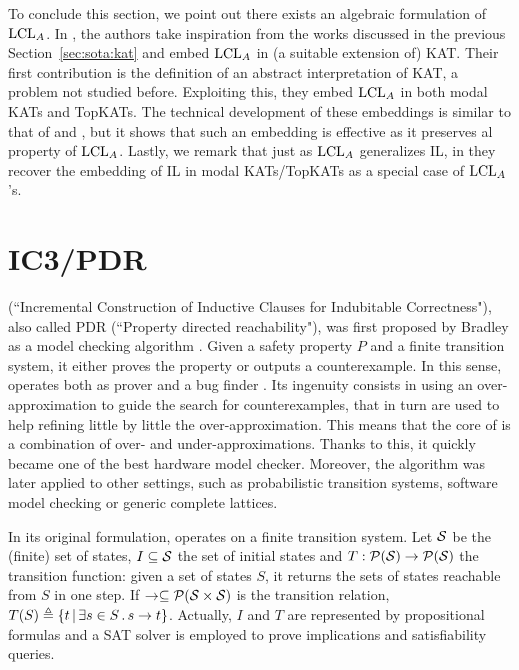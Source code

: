 To conclude this section, we point out there exists an algebraic formulation of $\text{LCL}_A$. In \cite{MR22}, the authors take inspiration from the works discussed in the previous Section~\ref{sec:sota:kat} and embed $\text{LCL}_A$ in (a suitable extension of) KAT. Their first contribution is the definition of an abstract interpretation of KAT, a problem not studied before. Exploiting this, they embed $\text{LCL}_A$ in both modal KATs and TopKATs. The technical development of these embeddings is similar to that of \cite{MOH21} and \cite{ZAG22}, but it shows that such an embedding is effective as it preserves al property of $\text{LCL}_A$. Lastly, we remark that just as $\text{LCL}_A$ generalizes IL, in \cite{MR22} they recover the embedding of IL in modal KATs/TopKATs as a special case of $\text{LCL}_A$'s.

\section{IC3/PDR}\label{sec:sota:pdr}
 (``Incremental Construction of Inductive Clauses for Indubitable Correctness"), also called PDR (``Property directed reachability"), was first proposed by Bradley as a model checking algorithm \cite{Bradley11}. Given a safety property $P$ and a finite transition system, it either proves the property or outputs a counterexample. In this sense,  operates both as prover and a bug finder \cite{Bradley12}. Its ingenuity consists in using an over-approximation to guide the search for counterexamples, that in turn are used to help refining little by little the over-approximation. This means that the core of  is a combination of over- and under-approximations.
Thanks to this, it quickly became one of the best hardware model checker. Moreover, the algorithm was later applied to other settings, such as probabilistic transition systems, software model checking or generic complete lattices.

In its original formulation,  operates on a finite transition system. Let $\mathcal{S}$ be the (finite) set of states, $I \subseteq \mathcal{S}$ the set of initial states and $T : \mathcal{P}(\mathcal{S}) \rightarrow \mathcal{P}(\mathcal{S})$ the transition function: given a set of states $S$, it returns the sets of states reachable from $S$ in one step. If $\rightarrow \subseteq \mathcal{P}(\mathcal{S} \times \mathcal{S})$ is the transition relation, $T(S) \triangleq \{ t \,\vert\, \exists s \in S \,.\, s \rightarrow t \}$.
Actually, $I$ and $T$ are represented by propositional formulas and a SAT solver is employed to prove implications and satisfiability queries.

